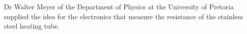 \documentclass[aip,rsi,preprint,graphicx]{revtex4-1} %
\begin{document}
%


\begin{acknowledgments}
Dr Walter Meyer of the Department of Physics at the University of Pretoria supplied the idea for the electronics that measure the resistance of the stainless steel heating tube. 
\end{acknowledgments}


\end{document}
